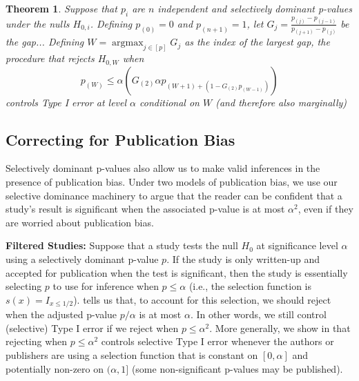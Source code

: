 \documentclass{article}
\DeclareMathOperator*{\argmax}{argmax}
\newtheorem{theorem}{Theorem}
\begin{document}
\begin{theorem}
    \label{thm:ratio_testing}
    Suppose that $p_i$ are $n$ independent and selectively dominant p-values under the nulls $H_{0, i}$. Defining $p_{(0)}=0$ and $p_{(n+1)}=1$, let $G_j = \frac{p_{(j)} - p_{(j - 1)}}{p_{(j+1)} - p_{(j)}}$ be the gap... Defining $W = \argmax_{j \in [p]} G_j$ as the index of the largest gap, the procedure that rejects $H_{0, W}$ when 
    \begin{equation}
        \label{eq:gap_cutoff}
        p_{(W)} \leq \alpha (G_{(2)}\alpha p_{(W+1) + (1 - G_{(2)}p_{(W - 1)}) })   
    \end{equation}
    controls Type I error at level $\alpha$ conditional on $W$ (and therefore also marginally)
\end{theorem}

 

\subsection{Correcting for Publication Bias}

Selectively dominant p-values also allow us to make valid inferences in the presence of publication bias. Under two models of publication bias, we use our selective dominance machinery to argue that the reader can be confident that a study's result is significant when the associated p-value is at most $\alpha^2$, even if they are worried about publication bias. \newline 

\noindent \textbf{Filtered Studies: } Suppose that a study tests the null $H_0$ at significance level $\alpha$ using a selectively dominant p-value $p$. If the study is only written-up and accepted for publication when the test is significant, then the study is essentially selecting $p$ to use for inference when $p \leq \alpha$ (i.e., the selection function is $s(x) = I_{x \leq 1/2}$).  tells us that, to account for this selection, we should reject when the adjusted p-value $p/\alpha$ is at most $\alpha$. In other words, we still control (selective) Type I error if we reject when $p \leq \alpha^2$. More generally, we show in  that rejecting when $p \leq \alpha^2$ controls selective Type I error whenever the authors or publishers are using a selection function that is constant on $[0, \alpha]$ and potentially non-zero on $(\alpha, 1]$ (some non-significant p-values may be published). \newline 
\end{document}
